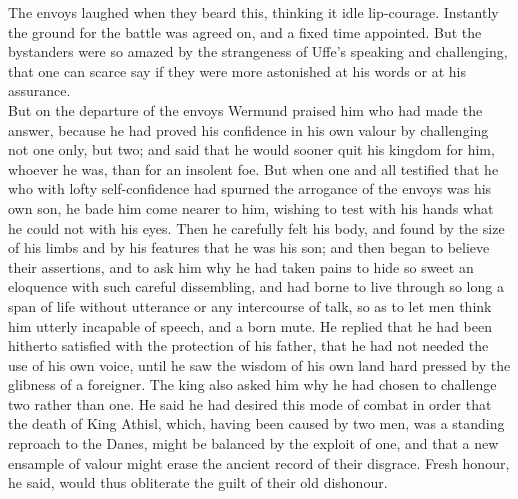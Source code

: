 \documentclass[10pt,a4paper]{report}
\begin{document}
The envoys laughed when they beard this, thinking it idle lip-courage. Instantly the ground for the battle was agreed on, and a fixed time appointed. But the bystanders were so amazed by the strangeness of Uffe's speaking and challenging, that one can scarce say if they were more astonished at his words or at his assurance.\\

But on the departure of the envoys Wermund praised him who had made the answer, because he had proved his confidence in his own valour by challenging not one only, but two; and said that he would sooner quit his kingdom for him, whoever he was, than for an insolent foe. But when one and all testified that he who with lofty self-confidence had spurned the arrogance of the envoys was his own son, he bade him come nearer to him, wishing to test with his hands what he could not with his eyes. Then he carefully felt his body, and found by the size of his limbs and by his features that he was his son; and then began to believe their assertions, and to ask him why he had taken pains to hide so sweet an eloquence with such careful dissembling, and had borne to live through so long a span of life without utterance or any intercourse of talk, so as to let men think him utterly incapable of speech, and a born mute. He replied that he had been hitherto satisfied with the protection of his father, that he had not needed the use of his own voice, until he saw the wisdom of his own land hard pressed by the glibness of a foreigner. The king also asked him why he had chosen to challenge two rather than one. He said he had desired this mode of combat in order that the death of King Athisl, which, having been caused by two men, was a standing reproach to the Danes, might be balanced by the exploit of one, and that a new ensample of valour might erase the ancient record of their disgrace. Fresh honour, he said, would thus obliterate the guilt of their old dishonour.\\
\end{document}
